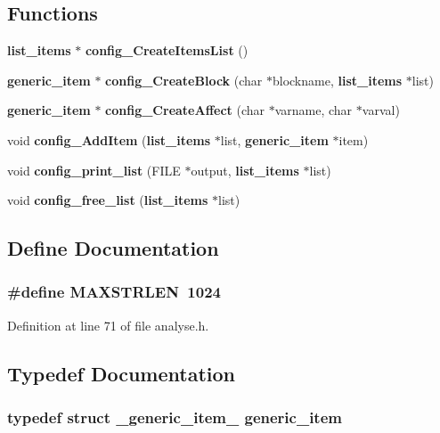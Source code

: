 \subsection*{Functions}
\begin{CompactItemize}
\item 
{\bf list\_\-items} $\ast$ {\bf config\_\-CreateItemsList} ()
\item 
{\bf generic\_\-item} $\ast$ {\bf config\_\-CreateBlock} (char $\ast$blockname, {\bf list\_\-items} $\ast$list)
\item 
{\bf generic\_\-item} $\ast$ {\bf config\_\-CreateAffect} (char $\ast$varname, char $\ast$varval)
\item 
void {\bf config\_\-AddItem} ({\bf list\_\-items} $\ast$list, {\bf generic\_\-item} $\ast$item)
\item 
void {\bf config\_\-print\_\-list} (FILE $\ast$output, {\bf list\_\-items} $\ast$list)
\item 
void {\bf config\_\-free\_\-list} ({\bf list\_\-items} $\ast$list)
\end{CompactItemize}


\subsection{Define Documentation}
\subsubsection[{MAXSTRLEN}]{\setlength{\rightskip}{0pt plus 5cm}\#define MAXSTRLEN~1024}\label{analyse_8h_b64c24e21a46ddfe0f4168c16b882846}




Definition at line 71 of file analyse.h.

\subsection{Typedef Documentation}
\subsubsection[{generic\_\-item}]{\setlength{\rightskip}{0pt plus 5cm}typedef struct {\bf \_\-generic\_\-item\_\-}  {\bf generic\_\-item}}\label{analyse_8h_6000e486d8247f4386926a6df782cc69}


